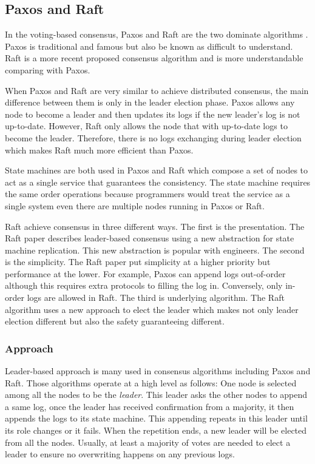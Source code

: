 \documentclass[12pt, a4paper]{article}
\begin{document}
\subsection{Paxos and Raft}

In the voting-based consensus, Paxos and Raft are the two dominate algorithms
\cite{howard2020paxos}.
Paxos is traditional and famous but also be known as difficult to understand.
Raft is a more recent proposed consensus algorithm and is more understandable
comparing with Paxos.

When Paxos and Raft are very similar to achieve distributed consensus,
the main difference between them is only in the leader election phase.
Paxos allows any node to become a leader and then updates its logs
if the new leader's log is not up-to-date.
However, Raft only allows the node that with up-to-date logs to become the leader.
Therefore, there is no logs exchanging during leader election
which makes Raft much more efficient than Paxos.

State machines are both used in Paxos and Raft which compose a set of nodes
to act as a single service that guarantees the consistency.
The state machine requires the same order operations because
programmers would treat the service as a single system even there are
multiple nodes running in Paxos or Raft.

Raft achieve consensus in three different ways.
The first is the presentation. The Raft paper describes leader-based consensus
using a new abstraction for state machine replication.
This new abstraction is popular with engineers.
The second is the simplicity. The Raft paper put simplicity at a higher priority but
performance at the lower. For example, Paxos can append logs out-of-order
although this requires extra protocols to filling the log in.
Conversely, only in-order logs are allowed in Raft.
The third is underlying algorithm. The Raft algorithm uses a new approach to elect
the leader which makes not only leader election different
but also the safety guaranteeing different.

\subsubsection{Approach}
Leader-based approach is many used in consensus algorithms including Paxos and Raft.
Those algorithms operate at a high level as follows:
One node is selected among all the nodes to be the \textit{leader}.
This leader asks the other nodes to append a same log,
once the leader has received confirmation from a majority,
it then appends the logs to its state machine. This appending repeats in this leader until
its role changes or it fails.
When the repetition ends, a new leader will be elected from all the nodes.
Usually, at least a majority of votes are needed to elect a leader to
ensure no overwriting happens on any previous logs.
\end{document}
